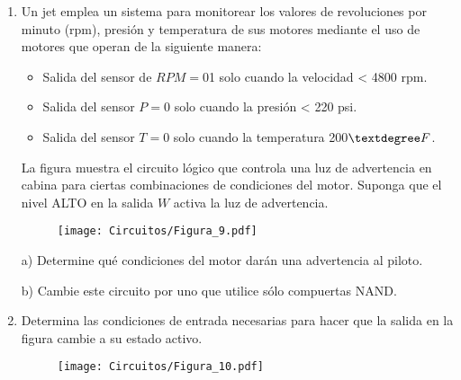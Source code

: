 \documentclass[a4paper, 12pt]{article}
\newcommand{\Aspace}{0.2cm}
\begin{document}
\begin{enumerate}
        \item Un jet emplea un sistema para monitorear los valores de revoluciones por minuto (rpm), presión y temperatura de sus motores mediante el uso de motores que operan de la siguiente manera:
        \begin{itemize}
            \item Salida del sensor de $RPM = 0$1 solo cuando la velocidad < 4800 rpm.
            \item Salida del sensor $P = 0$ solo cuando la presión < 220 psi.
            \item Salida del sensor $T = 0$ solo cuando la temperatura 200$\textdegree F$.
        \end{itemize}
        La figura muestra el circuito lógico que controla una luz de advertencia en cabina para ciertas combinaciones de condiciones del motor. Suponga que el nivel ALTO en la salida $W$ activa la luz de advertencia.
        \begin{figure}[!ht]
            \centering
            \texttt{[image: Circuitos/Figura\_9.pdf]}
        \end{figure}
            \vspace{\Aspace} \par
            a) Determine qué condiciones del motor darán una advertencia al piloto.
            \\ { \color{azul}  }

            \vspace{\Aspace} \par
            b) Cambie este circuito por uno que utilice sólo compuertas NAND.
            \\ { \color{azul}  }



        \item Determina las condiciones de entrada necesarias para hacer que la salida en la figura cambie a su estado activo.
        \begin{figure}[!ht]
            \centering
            \texttt{[image: Circuitos/Figura\_10.pdf]}
        \end{figure}
            \vspace{\Aspace} \par
            { \color{azul}  }




\end{enumerate}
\end{document}
